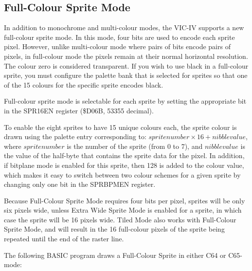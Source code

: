 \subsection{Full-Colour Sprite Mode}

In addition to monochrome and multi-colour modes, the VIC-IV supports a new full-colour sprite mode.  In this mode, four bits are used to
encode each sprite pixel.  However, unlike multi-colour mode where pairs of bits encode pairs of pixels, in full-colour mode the pixels
remain at their normal horizontal resolution.  The colour zero is considered transparent. If you wish to use black in a full-colour sprite,
you must configure the palette bank that is selected for sprites so that one of the 15 colours for the specific sprite encodes black.

Full-colour sprite mode is selectable for each sprite by setting the appropriate bit in the SPR16EN register (\$D06B, 53355 decimal).

To enable the eight sprites to have 15 unique colours each, the sprite colour is drawn using the palette entry corresponding to:
$sprite number \times 16 + nibble value$, where $sprite number$ is the number of the sprite (from 0 to 7), and $nibble value$ is the value
of the half-byte that contains the sprite data for the pixel.  In addition, if bitplane mode is enabled for this sprite, then 128 is
added to the colour value, which makes it easy to switch between two colour schemes for a given sprite by changing only one bit in the
SPRBPMEN register.

Because Full-Colour Sprite Mode requires four bits per pixel, sprites will be only six pixels wide, unless Extra Wide Sprite Mode is enabled
for a sprite, in which case the sprite will be 16 pixels wide.  Tiled Mode also works with Full-Colour Sprite Mode, and will result in the
16 full-colour pixels of the sprite being repeated until the end of the raster line.

The following BASIC program draws a Full-Colour Sprite in either C64 or C65-mode:

